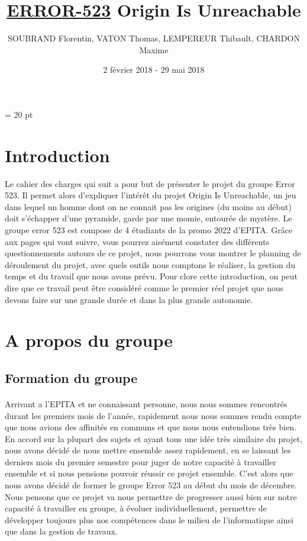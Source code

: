 \documentclass[12pt,a4paper]{article}
\title{\textbf { \huge{\underline{ERROR-523}} \bigbreak  \large{Origin Is Unreachable}}}
\author{SOUBRAND Florentin, VATON Thomas, LEMPEREUR Thibault, CHARDON Maxime}
\date {2 février 2018 - 29 mai 2018}
\begin{document}
\pagestyle{fancy}




\newpage
\thispagestyle{empty}
\tableofcontents
\baselineskip = 20 pt
\newpage

\section{Introduction}
Le cahier des charges qui suit a pour but de présenter le projet du groupe Error 523.
Il permet alors d'expliquer l'intérêt du projet Origin Is Unreachable, un jeu dans lequel un homme dont
on ne connait pas les origines (du moins au début) doit s'échapper d'une pyramide, garde par une
momie, entourée de mystère.
Le groupe error 523 est compose de 4 étudiants de la promo 2022 d’EPITA.
Grâce aux pages qui vont suivre, vous pourrez aisément constater des différents questionnements
autours de ce projet, nous pourrons vous montrer le planning de déroulement du projet, avec quels
outils nous comptons le réaliser, la gestion du temps et du travail que nous avons prévu.
Pour clore cette introduction, on peut dire que ce travail peut être considéré comme le premier réel
projet que nous devons faire sur une grande durée et dans la plus grande autonomie.

\newpage
\section {A propos du groupe}
\subsection{Formation du groupe}
\paragraph{}
Arrivant a l'EPITA et ne connaissant personne, nous nous sommes rencontrés durant les premiers mois de l'année, rapidement nous nous sommes rendu compte que nous avions des affinités en communs et que nous nous entendions très bien. En accord sur la plupart des sujets et ayant tous une idée très similaire du projet, nous avons décidé de nous mettre ensemble assez rapidement, en se laissant les derniers mois du premier semestre pour juger de notre capacité à travailler ensemble et si nous pensions pouvoir réussir ce projet ensemble. C'est alors que nous avons décidé de former le groupe Error 523 au début du mois de décembre. Nous pensons que ce projet va nous permettre de progresser aussi bien sur notre capacité à travailler en groupe, à évoluer individuellement, permettre de développer toujours plus nos compétences dans le milieu de l'informatique ainsi que dans la gestion de travaux.
\end{document}
